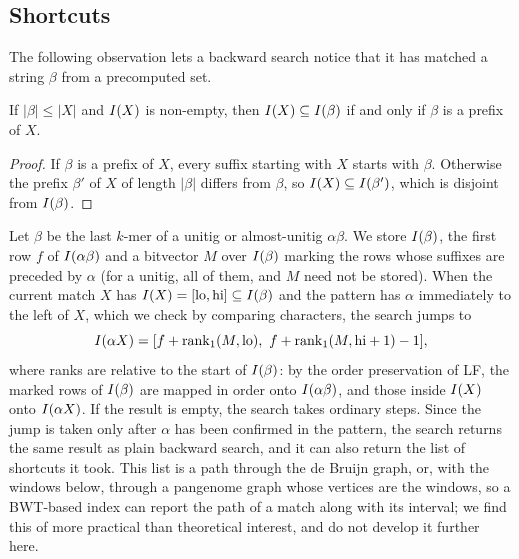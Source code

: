 \subsection{Shortcuts}
\label{sec:shortcuts}

The following observation lets a backward search notice that it has
matched a string $\beta$ from a precomputed set.

\begin{lemma}
\label{lem:detect}
If $|\beta| \le |X|$ and $I(X)$ is non-empty, then $I(X)
\subseteq I(\beta)$ if and only if $\beta$ is a prefix of $X$.
\end{lemma}

\begin{proof}
If $\beta$ is a prefix of $X$, every suffix starting with $X$ starts
with $\beta$. Otherwise the prefix $\beta'$ of $X$ of length $|\beta|$
differs from $\beta$, so $I(X) \subseteq I(\beta')$, which is
disjoint from $I(\beta)$.
\end{proof}

Let $\beta$ be the last $k$-mer of a unitig or almost-unitig $\alpha
\beta$. We store $I(\beta)$, the first row $f$ of $I(\alpha
\beta)$ and a bitvector $M$ over $I(\beta)$ marking the rows whose
suffixes are preceded by $\alpha$ (for a unitig, all of them, and $M$
need not be stored). When the current match $X$ has $I(X) =
[\mathrm{lo}, \mathrm{hi}] \subseteq I(\beta)$ and the pattern has
$\alpha$ immediately to the left of $X$, which we check by comparing
characters, the search jumps to
\[
I(\alpha X) = [f + \mathrm{rank}_1(M, \mathrm{lo}),\ f +
\mathrm{rank}_1(M, \mathrm{hi} + 1) - 1],
\]
where ranks are relative to the start of $I(\beta)$: by the order
preservation of LF, the marked rows of $I(\beta)$ are mapped in
order onto $I(\alpha\beta)$, and those inside $I(X)$ onto
$I(\alpha X)$. If the result is empty, the search takes ordinary
steps. Since the jump is taken only after $\alpha$ has been confirmed in
the pattern, the search returns the same result as plain backward
search, and it can also return the list of shortcuts it took. This list
is a path through the de Bruijn graph, or, with the windows below,
through a pangenome graph whose vertices are the windows, so a BWT-based
index can report the path of a match along with its interval; we find
this of more practical than theoretical interest, and do not develop
it further here.

